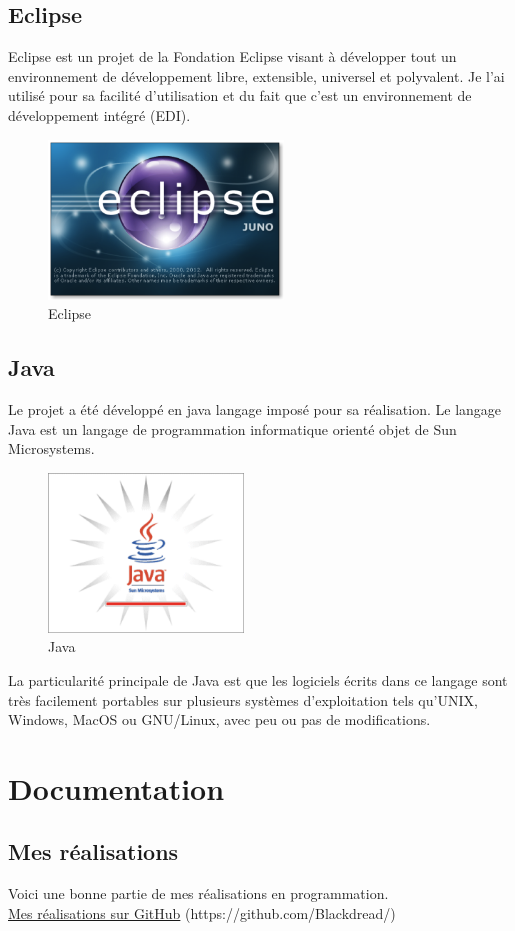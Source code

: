 \documentclass{report}
\begin{document}
\section{Eclipse}
Eclipse  est  un  projet  de  la  Fondation  Eclipse  visant  à  développer  tout  un environnement de développement libre, extensible, universel et polyvalent. Je  l’ai  utilisé  pour  sa  facilité  d’utilisation  et  du  fait  que  c’est  un environnement de développement intégré (EDI).
\begin{figure}[H]
\center
\includegraphics[height=120pt]{eclipse.png}
\caption{Eclipse}
\label{Eclipse}
\end{figure}
\section{Java}
Le  projet  a  été  développé  en  java  langage  imposé  pour  sa  réalisation.  Le langage Java est un langage de programmation informatique orienté objet de Sun Microsystems.
\begin{figure}[H]
\center
\includegraphics[height=120pt]{java.png}
\caption{Java}
\label{Java}
\end{figure}
La  particularité  principale  de  Java  est  que  les  logiciels  écrits  dans  ce  langage sont  très  facilement  portables  sur  plusieurs  systèmes  d’exploitation  tels qu’UNIX, Windows, MacOS ou GNU/Linux, avec peu ou pas de modifications.

\appendix
\chapter{Documentation}
\section{Mes réalisations}
Voici une bonne partie de mes réalisations en programmation.
\\
\href{https://github.com/Blackdread/}{Mes réalisations sur GitHub} (https://github.com/Blackdread/)
\\
\end{document}
